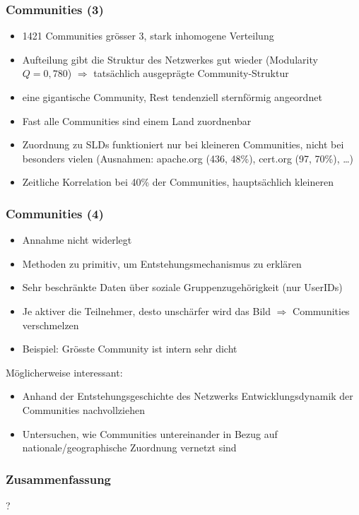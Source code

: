 \documentclass[10pt]{beamer}
\begin{document}
\begin{frame}
  \frametitle{Communities (3)}
  \begin{itemize}
  \item 1421 Communities gr\"osser 3, stark inhomogene Verteilung
  \item Aufteilung gibt die Struktur des Netzwerkes gut wieder
    (Modularity $Q=0,780$) $\Rightarrow$ tats\"achlich ausgepr\"agte
    Community-Struktur
  \item eine gigantische Community, Rest tendenziell sternf\"ormig
    angeordnet
  \item Fast alle Communities sind einem Land zuordnenbar
  \item Zuordnung zu SLDs funktioniert nur bei kleineren Communities,
    nicht bei besonders vielen (Ausnahmen: apache.org (436, 48\%),
    cert.org (97, 70\%), \dots)
  \item Zeitliche Korrelation bei 40\% der Communities,
    haupts\"achlich kleineren
  \end{itemize}
  
\end{frame}

\begin{frame}
  \frametitle{Communities (4)}

  \begin{itemize}
  \item Annahme nicht widerlegt
  \item Methoden zu primitiv, um Entstehungsmechanismus zu erkl\"aren
  \item Sehr beschr\"ankte Daten \"uber soziale Gruppenzugeh\"origkeit
    (nur UserIDs)
  \item Je aktiver die Teilnehmer, desto unsch\"arfer wird das Bild
    $\Rightarrow$ Communities verschmelzen
  \item Beispiel: Gr\"osste Community ist intern sehr dicht
  \end{itemize}

  
  M\"oglicherweise interessant:
  \begin{itemize}
  \item Anhand der Entstehungsgeschichte
    des Netzwerks Entwicklungsdynamik der Communities nachvollziehen
  \item Untersuchen, wie Communities untereinander in Bezug auf
    nationale/geographische Zuordnung vernetzt sind
  \end{itemize}
  
\end{frame}

\begin{frame}
  \frametitle{Zusammenfassung}
  
\end{frame}


\begin{frame}
  \begin{center}
    {\Huge ?}
  \end{center}
  
\end{frame}
\end{document}
